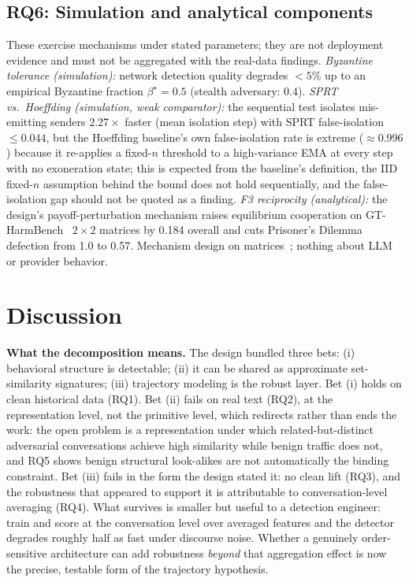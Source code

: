 \documentclass[letterpaper,twocolumn,10pt]{article}
\begin{document}
\subsection{RQ6: Simulation and analytical components}
\label{sec:rq6}
These exercise mechanisms under stated parameters; they are not deployment
evidence and must not be aggregated with the real-data findings.
\emph{Byzantine tolerance (simulation):} network detection quality degrades
$<5\%$ up to an empirical Byzantine fraction $\beta^\star = 0.5$ (stealth
adversary: 0.4). \emph{SPRT vs.\ Hoeffding (simulation, weak comparator):}
the sequential test isolates mis-emitting senders $2.27\times$ faster (mean
isolation step) with SPRT false-isolation $\leq 0.044$, but the Hoeffding
baseline's own false-isolation rate is extreme ($\approx 0.996$) because it
re-applies a fixed-$n$ threshold to a high-variance EMA at every step with
no exoneration state; this is expected from the baseline's definition, the
IID fixed-$n$ assumption behind the bound does not hold sequentially, and
the false-isolation gap should not be quoted as a finding.
\emph{F3 reciprocity (analytical):} the design's payoff-perturbation
mechanism raises equilibrium cooperation on
GT-HarmBench~\cite{gtharmbench2026} $2\times2$ matrices by 0.184 overall and
cuts Prisoner's Dilemma defection from 1.0 to 0.57. Mechanism design on
matrices~\cite{ostrom1990}; nothing about LLM or provider behavior.

\section{Discussion}
\label{sec:discussion}

\textbf{What the decomposition means.} The design bundled three bets:
(i) behavioral structure is detectable; (ii) it can be shared as approximate
set-similarity signatures; (iii) trajectory modeling is the robust layer.
Bet (i) holds on clean historical data (RQ1). Bet (ii) fails on real text
(RQ2), at the representation level, not the primitive level, which
redirects rather than ends the work: the open problem is a representation
under which related-but-distinct adversarial conversations achieve high
similarity while benign traffic does not, and RQ5 shows benign structural
look-alikes are not automatically the binding constraint. Bet (iii) fails in
the form the design stated it: no clean lift (RQ3), and the robustness that
appeared to support it is attributable to conversation-level averaging
(RQ4). What survives is smaller but useful to a detection engineer: train
and score at the conversation level over averaged features and the detector
degrades roughly half as fast under discourse noise. Whether a genuinely
order-sensitive architecture can add robustness \emph{beyond} that
aggregation effect is now the precise, testable form of the trajectory
hypothesis.
\end{document}
